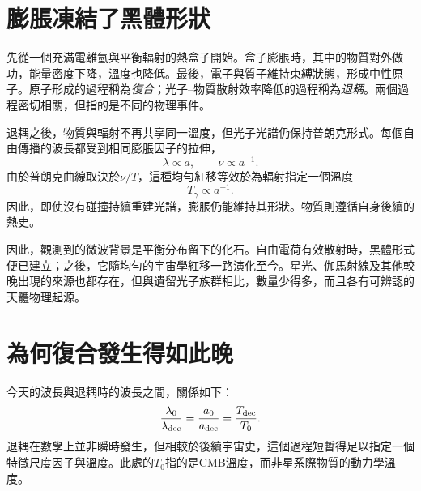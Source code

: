 \begin{classroomqa}
\end{classroomqa}

\section{膨脹凍結了黑體形狀}

先從一個充滿電離氫與平衡輻射的熱盒子開始。盒子膨脹時，其中的物質對外做功，能量密度下降，溫度也降低。最後，電子與質子維持束縛狀態，形成中性原子。原子形成的過程稱為\emph{復合}；光子--物質散射效率降低的過程稱為\emph{退耦}。兩個過程密切相關，但指的是不同的物理事件。

退耦之後，物質與輻射不再共享同一溫度，但光子光譜仍保持普朗克形式。每個自由傳播的波長都受到相同膨脹因子的拉伸，
\begin{equation}
\lambda\propto a,
\qquad
\nu\propto a^{-1}.
\end{equation}
由於普朗克曲線取決於\(\nu/T\)，這種均勻紅移等效於為輻射指定一個溫度
\begin{equation}
\boxed{T_\gamma\propto a^{-1}.}
\label{eq:c07-temperature-scaling}
\end{equation}
因此，即使沒有碰撞持續重建光譜，膨脹仍能維持其形狀。物質則遵循自身後續的熱史。

因此，觀測到的微波背景是平衡分布留下的化石。自由電荷有效散射時，黑體形式便已建立；之後，它隨均勻的宇宙學紅移一路演化至今。星光、伽馬射線及其他較晚出現的來源也都存在，但與遺留光子族群相比，數量少得多，而且各有可辨認的天體物理起源。

\begin{classroomqa}
\end{classroomqa}

\section{為何復合發生得如此晚}

今天的波長與退耦時的波長之間，關係如下：
\begin{equation}
\frac{\lambda_0}{\lambda_{\rm dec}}
=
\frac{a_0}{a_{\rm dec}}
=
\frac{T_{\rm dec}}{T_0}.
\label{eq:c07-decoupling-ratio}
\end{equation}
退耦在數學上並非瞬時發生，但相較於後續宇宙史，這個過程短暫得足以指定一個特徵尺度因子與溫度。此處的\(T_0\)指的是CMB溫度，而非星系際物質的動力學溫度。

